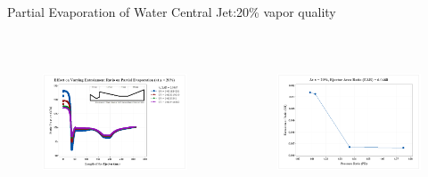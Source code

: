 \begin{frame}{Partial Evaporation of Water Central Jet:20\% vapor quality}
\begin{columns}
        \begin{figure}
        \centering
        \includegraphics[height=4.5cm]{images/pe20vqver.png}
    \end{figure}
        \begin{figure}
        \centering
        \includegraphics[height=4.5cm]{images/pe20vqerpr.png}
    \end{figure}
\end{columns}
\end{frame}

